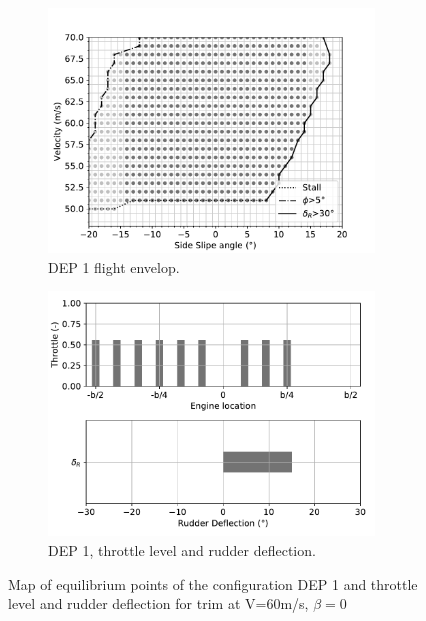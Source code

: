 \begin{figure}
	\begin{subfigure}{0.49\textwidth}
		\includegraphics[width=0.95\textwidth]{originalMapBetaVelfin1Eng15RudFalse}
		\caption{DEP 1 flight envelop.}
		\label{fig:originalfin1_15engine}
	\end{subfigure}
	\begin{subfigure}{0.49\textwidth}
		\includegraphics[width=0.95\textwidth]{Defloriginalfin1Eng15RudFalse}
		\caption{DEP 1, throttle level and rudder deflection.}
		\label{fig:Defloriginalfin1_15engine}
	\end{subfigure}
	\caption{Map of equilibrium points of the configuration DEP 1 and throttle level and rudder deflection for trim at V=60m/s, $\beta=0$} \label{DeflOrignialeNoDiffThrust}
\end{figure}

